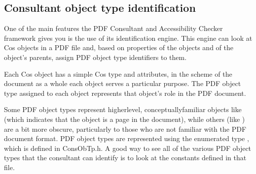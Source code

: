 \documentclass[letterpaper,12pt,english,openany,oneside]{sphinxmanual}
\begin{document}
\begin{sphinxVerbatim}[commandchars=\\\{\}]
          
     
   
   
        
       \PYG{l+s+s2}{[}
       
       \PYG{l+s+s2}{]}
 
\end{sphinxVerbatim}


\subsection{Consultant object type identification}
\label{\detokenize{Plugins_ExtendedAPI:consultant-object-type-identification}}
One of the main features the PDF Consultant and Accessibility Checker framework gives you is the use of its identification engine. This engine can look at Cos objects in a PDF file and, based on properties of the objects and of the object’s parents, assign PDF object type identifiers to them.

Each Cos object has a simple Cos type and attributes, in the scheme of the document as a whole each object serves a particular purpose. The PDF object type assigned to each object represents that object’s role in the PDF document.

Some PDF object types represent higher\sphinxhyphen{}level, conceptually\sphinxhyphen{}familiar objects like  (which indicates that the object is a page in the document), while others (like  ) are a bit more obscure, particularly to those who are not familiar with the PDF document format. PDF object types are represented using the enumerated type , which is defined in ConsObTp.h. A good way to see all of the various PDF object types that the consultant can identify is to look at the constants defined in that file.
\end{document}
